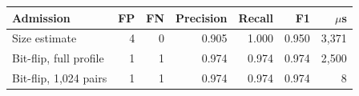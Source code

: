 \begin{tabular}{@{}lrrrrrr@{}}
\toprule
Admission & FP & FN & Precision & Recall & F1 & $\mu$s \\
\midrule
Size estimate            & 4 & 0 & 0.905 & 1.000 & 0.950 & 3{,}371 \\
Bit-flip, full profile   & 1 & 1 & 0.974 & 0.974 & 0.974 & 2{,}500 \\
Bit-flip, 1{,}024 pairs  & 1 & 1 & 0.974 & 0.974 & 0.974 & 8 \\
\bottomrule
\end{tabular}
